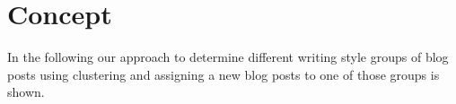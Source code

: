 
\section{Concept}
\label{sec:concept}
In the following our approach to determine different writing style groups of blog posts using clustering and assigning a new blog posts to one of those groups is shown.




